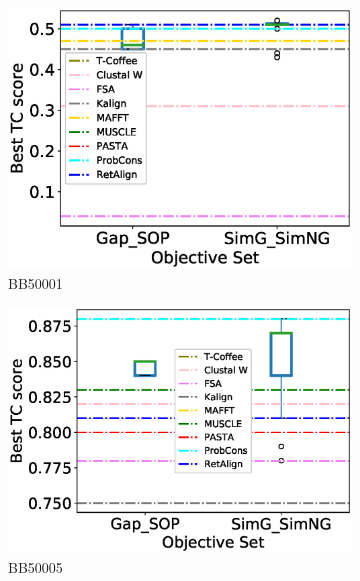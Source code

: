 \begin{figure}[!htbp]
\begin{adjustwidth}{-1.5cm}{-1cm}
		\begin{subfigure}{0.22\textwidth}
			\includegraphics[width=\columnwidth]{Figure/summary/precomputedInit/Balibase/BB50001_objset_tc_rank_2}
			\caption{BB50001}
		\end{subfigure}	
		\begin{subfigure}{0.22\textwidth}
			\includegraphics[width=\columnwidth]{Figure/summary/precomputedInit/Balibase/BB50005_objset_tc_rank_2}
			\caption{BB50005}
		\end{subfigure}
		\begin{subfigure}{0.22\textwidth}

\end{subfigure}
\end{adjustwidth}
\end{figure}

